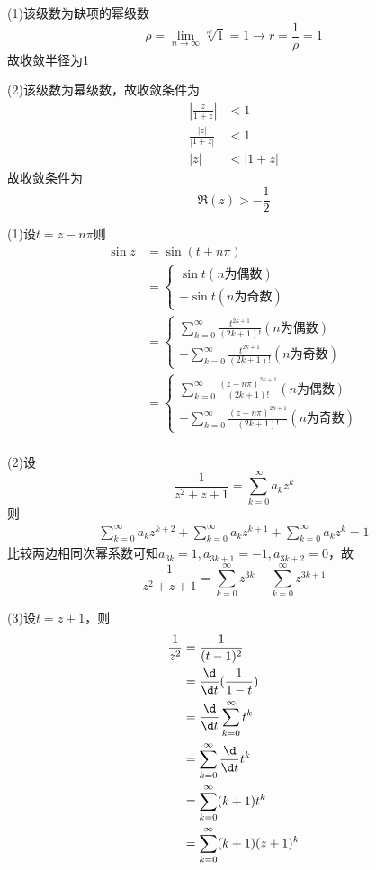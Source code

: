 \documentclass{phyasgn}
\begin{document}
\begin{sol}[1]
(1)该级数为缺项的幂级数
 $$\rho=\lim\limits_{n\to\infty}\sqrt[n!]{1}=1\to r=\frac{1}{\rho}=1$$
故收敛半径为1

(2)该级数为幂级数，故收敛条件为
 \begin{align*}
    |\frac{z}{1+z}|&<1\\
    \frac{|z|}{|1+z|}&<1\\
    |z|&<|1+z|
\end{align*} 
故收敛条件为
$$\Re (z)>-\frac{1}{2}$$ 
\end{sol}\par
 
\begin{sol}[2]
    (1)设$t=z-n\pi$则
     \begin{align*}
        \sin z&=\sin(t+n\pi)\\
        &=\left\{\begin{matrix}
           \sin t(n\text{为偶数}) \\
           -\sin t(n\text{为奇数})
           \end{matrix}\right.\\
        &=\left\{\begin{matrix}
            \sum_{k=0}^{\infty}\frac{t^{2k+1}}{(2k+1)!}(n\text{为偶数}) \\
            -\sum_{k=0}^{\infty}\frac{t^{2k+1}}{(2k+1)!}(n\text{为奇数})
            \end{matrix}\right.\\
            &=\left\{\begin{matrix}
                \sum_{k=0}^{\infty}\frac{(z-n\pi)^{2k+1}}{(2k+1)!}(n\text{为偶数}) \\
                -\sum_{k=0}^{\infty}\frac{(z-n\pi)^{2k+1}}{(2k+1)!}(n\text{为奇数})
                \end{matrix}\right.\\
    \end{align*} 

    (2)设
     $$\frac{1}{z^2+z+1}=\sum_{k=0}^{\infty}a_kz^k $$
    则
     \begin{align*}
        \sum_{k=0}^{\infty}a_kz^{k+2}+\sum_{k=0}^{\infty}a_kz^{k+1}+\sum_{k=0}^{\infty}a_kz^k=1
    \end{align*} 
    比较两边相同次幂系数可知$a_{3k}=1,a_{3k+1}=-1,a_{3k+2}=0$，故
     $$\frac{1}{z^2+z+1}=\sum_{k=0}^{\infty}z^{3k}-\sum_{k=0}^{\infty}z^{3k+1} $$

    (3)设$t=z+1$，则
     \begin{align*}
        \frac{1}{z^2}&=\frac{1}{(t-1)^2}\\
        &=\frac{\d}{\d t}(\frac{1}{1-t})\\
        &=\frac{\d}{\d t}\sum_{k=0}^{\infty}t^k\\
        &=\sum_{k=0}^{\infty}\frac{\d}{\d t}t^k\\
        &=\sum_{k=0}^{\infty}(k+1)t^k\\
        &=\sum_{k=0}^{\infty}(k+1)(z+1)^k
    \end{align*} 
    

\end{sol}
\end{document}
